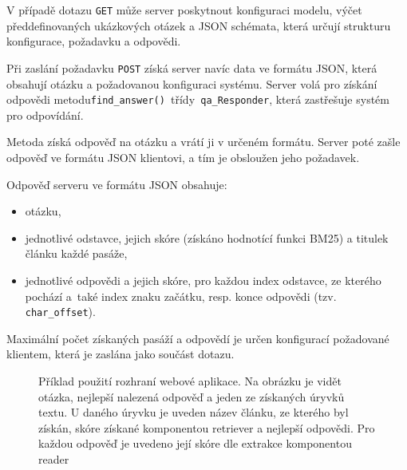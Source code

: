 V případě dotazu \texttt{GET} může server poskytnout konfiguraci modelu, výčet předdefinovaných ukázkových otázek a JSON schémata, která určují strukturu konfigurace, požadavku a odpovědi.\par
Při zaslání požadavku \texttt{POST} získá server navíc data ve formátu JSON, která obsahují otázku a požadovanou konfiguraci systému. Server volá pro získání odpovědi metodu\linebreak \texttt{find\_answer() }třídy\texttt{ qa\_Responder}, která zastřešuje systém pro odpovídání.\par
\noindent Metoda získá odpověď na otázku a vrátí ji v určeném formátu. Server poté zašle odpověď ve formátu JSON klientovi, a tím je obsloužen jeho požadavek.\par
\noindent Odpověď serveru ve formátu JSON obsahuje: 
\begin{itemize}
\itemsep-0.1em 
    \item otázku,
    \item jednotlivé odstavce, jejich skóre (získáno hodnotící funkci BM25) a titulek článku každé pasáže,
    \item jednotlivé odpovědi a jejich skóre, pro každou index odstavce, ze kterého pochází a~také index znaku začátku, resp. konce odpovědi (tzv. \texttt{char\_offset}).
\end{itemize}
Maximální počet získaných pasáží a odpovědí je určen konfigurací požadované klientem, která je zaslána jako součást dotazu.
\medskip
\begin{figure}[hbt]
	\centering
	\caption{Příklad použití rozhraní webové aplikace. Na obrázku je vidět otázka, nejlepší nalezená odpověď a jeden ze získaných úryvků textu. U daného úryvku je uveden název článku, ze kterého byl získán, skóre získané komponentou retriever a nejlepší odpovědi. Pro každou odpověď je uvedeno její skóre dle extrakce komponentou reader}
	\label{UI1_example}
\end{figure}

